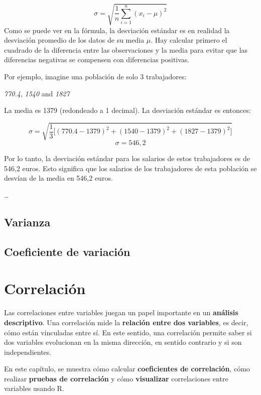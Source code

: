 \documentclass[
]{book}
\begin{document}
\[\sigma = \sqrt{\frac{1}{n}\sum^n_{i = 1}(x_i - \mu)^2}\]
Como se puede ver en la fórmula, la desviación estándar es en realidad la desviación promedio de los datos de su media \(\mu\). Hay calcular primero el cuadrado de la diferencia entre las observaciones y la media para evitar que las diferencias negativas se compensen con diferencias positivas.

Por ejemplo, imagine una población de solo 3 trabajadores:

\emph{770.4}, \emph{1540} and \emph{1827}

La media es 1379 (redondeado a 1 decimal). La desviación estándar es entonces:

\[\sigma = \sqrt{\frac{1}{3}\big[(770.4 - 1379)^2 + (1540 - 1379)^2 + (1827 - 1379)^2 \big]}\]
\[\sigma = 546,2\]

Por lo tanto, la desviación estándar para los salarios de estos trabajadores es de 546,2 euros. Esto significa que los salarios de los trabajadores de esta población se desvían de la media en 546,2 euros.

\ldots{}

\hypertarget{varianza}{%
\subsection{Varianza}\label{varianza}}

\hypertarget{coeficiente-de-variaciuxf3n}{%
\subsection{Coeficiente de variación}\label{coeficiente-de-variaciuxf3n}}

\hypertarget{correlaciuxf3n}{%
\section{Correlación}\label{correlaciuxf3n}}

Las correlaciones entre variables juegan un papel importante en un \textbf{análisis descriptivo}. Una correlación mide la \textbf{relación entre dos variables}, es decir, cómo están vinculadas entre sí. En este sentido, una correlación permite saber si dos variables evolucionan en la misma dirección, en sentido contrario y si son independientes.

En este capítulo, se muestra cómo calcular \textbf{coeficientes de correlación}, cómo realizar \textbf{pruebas de correlación} y cómo \textbf{visualizar} correlaciones entre variables usando R.
\end{document}
